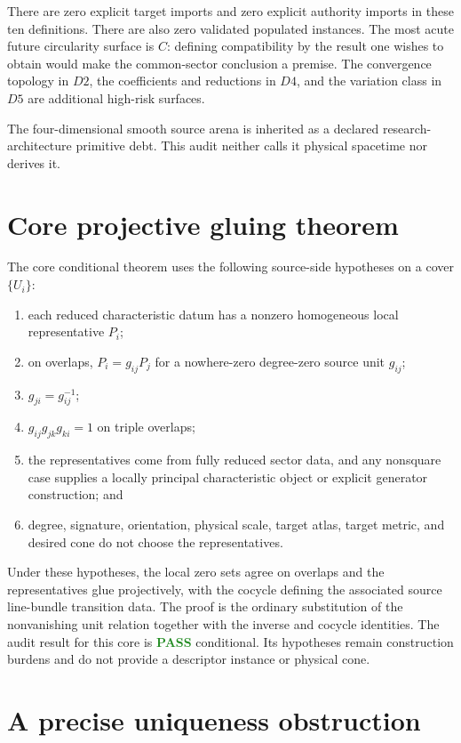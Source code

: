 \documentclass[11pt]{article}
\newcommand{\pass}{\textcolor{ForestGreen}{\textbf{PASS}}}
\begin{document}
There are zero explicit target imports and zero explicit authority imports in
these ten definitions.  There are also zero validated populated instances.
The most acute future circularity surface is $C$: defining compatibility by
the result one wishes to obtain would make the common-sector conclusion a
premise.  The convergence topology in $D2$, the coefficients and reductions
in $D4$, and the variation class in $D5$ are additional high-risk surfaces.

The four-dimensional smooth source arena is inherited as a declared
research-architecture primitive debt.  This audit neither calls it physical
spacetime nor derives it.

\section{Core projective gluing theorem}

The core conditional theorem uses the following source-side hypotheses on a
cover $\{U_i\}$:
\begin{enumerate}
  \item each reduced characteristic datum has a nonzero homogeneous local
        representative $P_i$;
  \item on overlaps, $P_i=g_{ij}P_j$ for a nowhere-zero degree-zero source
        unit $g_{ij}$;
  \item $g_{ji}=g_{ij}^{-1}$;
  \item $g_{ij}g_{jk}g_{ki}=1$ on triple overlaps;
  \item the representatives come from fully reduced sector data, and any
        nonsquare case supplies a locally principal characteristic object or
        explicit generator construction; and
  \item degree, signature, orientation, physical scale, target atlas, target
        metric, and desired cone do not choose the representatives.
\end{enumerate}

Under these hypotheses, the local zero sets agree on overlaps and the
representatives glue projectively, with the cocycle defining the associated
source line-bundle transition data.  The proof is the ordinary substitution
of the nonvanishing unit relation together with the inverse and cocycle
identities.  The audit result for this core is \pass{} conditional.  Its
hypotheses remain construction burdens and do not provide a descriptor
instance or physical cone.

\section{A precise uniqueness obstruction}
\end{document}
